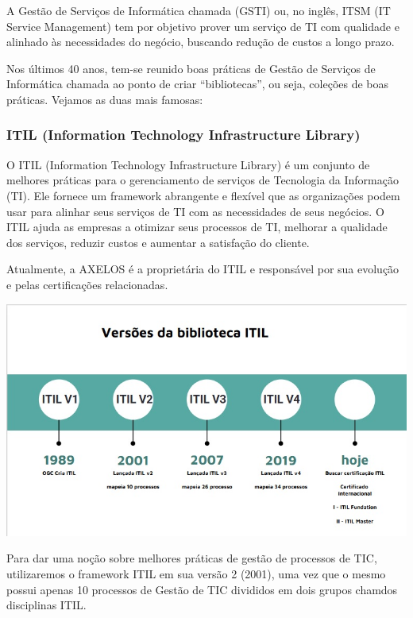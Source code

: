 \documentclass[
]{book}
\begin{document}
A Gestão de Serviços de Informática chamada (GSTI) ou, no inglês, ITSM (IT Service Management) tem por objetivo prover um serviço de TI com qualidade e alinhado às necessidades do negócio, buscando redução de custos a longo prazo.

Nos últimos 40 anos, tem-se reunido boas práticas de Gestão de Serviços de Informática chamada ao ponto de criar ``bibliotecas'', ou seja, coleções de boas práticas. Vejamos as duas mais famosas:

\subsubsection{ITIL (Information Technology Infrastructure Library)}\label{itil-information-technology-infrastructure-library}

O ITIL (Information Technology Infrastructure Library) é um conjunto de melhores práticas para o gerenciamento de serviços de Tecnologia da Informação (TI). Ele fornece um framework abrangente e flexível que as organizações podem usar para alinhar seus serviços de TI com as necessidades de seus negócios. O ITIL ajuda as empresas a otimizar seus processos de TI, melhorar a qualidade dos serviços, reduzir custos e aumentar a satisfação do cliente.

Atualmente, a AXELOS é a proprietária do ITIL e responsável por sua evolução e pelas certificações relacionadas.

\includegraphics{images/InfraEstrutura/ITIL/Linha_do_Tempo.jpg}

Para dar uma noção sobre melhores práticas de gestão de processos de TIC, utilizaremos o framework ITIL em sua versão 2 (2001), uma vez que o mesmo possui apenas 10 processos de Gestão de TIC divididos em dois grupos chamdos disciplinas ITIL.
\end{document}
